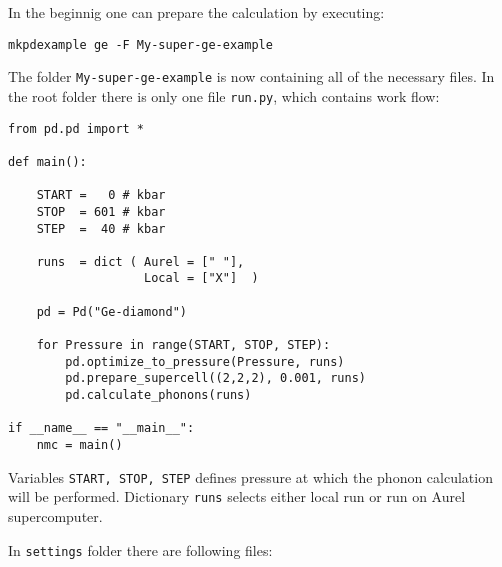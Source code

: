 \documentclass[12pt]{article}
\begin{document}
In the beginnig one can prepare the calculation by executing:

\begin{verbatim}
mkpdexample ge -F My-super-ge-example
\end{verbatim}

The folder \texttt{My-super-ge-example} is now containing all of the necessary files. In the root folder there is only one file \texttt{run.py}, which contains work flow:

\begin{verbatim}
from pd.pd import *

def main():

    START =   0 # kbar
    STOP  = 601 # kbar
    STEP  =  40 # kbar

    runs  = dict ( Aurel = [" "],
                   Local = ["X"]  )

    pd = Pd("Ge-diamond")

    for Pressure in range(START, STOP, STEP):
        pd.optimize_to_pressure(Pressure, runs)
        pd.prepare_supercell((2,2,2), 0.001, runs)
        pd.calculate_phonons(runs)

if __name__ == "__main__":
    nmc = main()
\end{verbatim}

Variables \texttt{START, STOP, STEP} defines pressure at which the phonon calculation will be performed. Dictionary \texttt{runs} selects either local run or run on Aurel supercomputer.

In \texttt{settings} folder there are following files:
\end{document}
